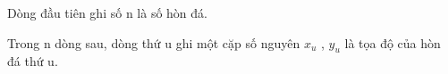 Dòng đầu tiên ghi số n là số hòn đá.  

   Trong n dòng sau, dòng thứ u ghi một cặp số nguyên $x_{u}$   , $y_{u}$   là tọa độ của hòn đá thứ u.